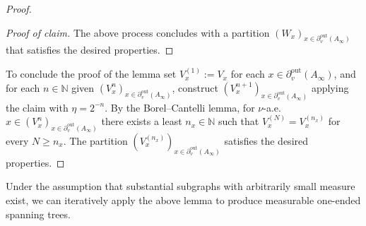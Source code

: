 \documentclass[letterpaper,11pt,reqno]{amsart}
\theoremstyle{bfnote}
\theoremstyle{definition}
\newcommand{\0}{\varnothing}
\renewcommand{\geq}{\geqslant}
\numberwithin{equation}{section}
\begin{document}
\begin{proof}
\begin{proof}[Proof of claim]
    The above process concludes with a partition $(W_x)_{x\in \partial_v^{\mathrm{out}} (A_\infty)}$ that satisfies the desired properties.

    
    \end{proof}

   To conclude the proof of the lemma set $V_x^{(1)} := V_x$ for each $x\in \partial_v^{\mathrm{out}} (A_\infty)$, and for each $n\in \mathbb N$ given $(V_x^{n})_{x \in \partial_v^{\mathrm{out}} (A_\infty)}$, construct $(V_x^{n+1})_{x \in \partial_v^{\mathrm{out}} (A_\infty)}$ applying the claim with $\eta = 2^{-n}$. By the Borel--Cantelli lemma, for $\nu$-a.e.\ $x\in (V_x^{n})_{x \in \partial_v^{\mathrm{out}} (A_\infty)}$ there exists a least $n_x \in \mathbb N$ such that $V_x^{(N)} = V_x^{(n_x)}$ for every $N \geq n_x$. The partition $(V_x^{(n_x)})_{x \in \partial_v^{\mathrm{out}} (A_\infty)}$ satisfies the desired properties.  
\end{proof}

Under the assumption that substantial subgraphs with arbitrarily small measure exist, we can iteratively apply the above lemma to produce measurable one-ended spanning trees. 
\end{document}
